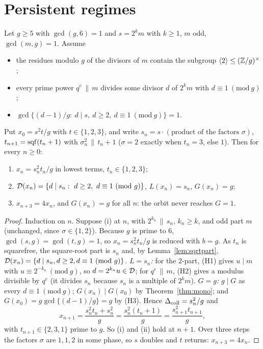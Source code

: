 \section{Persistent regimes}

\begin{theorem}\label{thm:Pg}
Let \(g\ge5\) with \(\gcd(g,6)=1\) and \(s=2^km\) with \(k\ge1\), \(m\) odd, \(\gcd(m,g)=1\). Assume
\begin{itemize}[nosep]
\item[(H1)] the residues modulo \(g\) of the divisors of \(m\) contain the subgroup \(\langle2\rangle\le(\mathbb{Z}/g)^\times\);
\item[(H2)] every prime power \(q^e\,\|\,m\) divides some divisor \(d\) of \(2^km\) with \(d\equiv1\ (\mathrm{mod}\ g)\);
\item[(H3)] \(\gcd\{(d-1)/g:\ d\mid s,\ d\ge2,\ d\equiv1\ (\mathrm{mod}\ g)\}=1\).
\end{itemize}
Put \(x_0=s^2t/g\) with \(t\in\{1,2,3\}\), and write \(s_n=s\cdot(\text{product of the factors }\sigma)\), \(t_{n+1}=\operatorname{sqf}(t_n+1)\) with \(\sigma_n^2\,\|\,t_n+1\) (\(\sigma=2\) exactly when \(t_n=3\), else \(1\)). Then for every \(n\ge0\):
\begin{enumerate}[label=(\roman*),nosep]
\item \(x_n=s_n^2t_n/g\) in lowest terms, \(t_n\in\{1,2,3\}\);
\item \(\Dx(x_n)=\{d\mid s_n:\ d\ge2,\ d\equiv1\ (\mathrm{mod}\ g)\}\), \(L(x_n)=s_n\), \(G(x_n)=g\);
\item \(x_{n+3}=4x_n\), and \(G(x_n)=g\) for all \(n\): the orbit never reaches \(G=1\).
\end{enumerate}
\end{theorem}
\begin{proof}
Induction on \(n\). Suppose (i) at \(n\), with \(2^{k_n}\,\|\,s_n\), \(k_n\ge k\), and odd part \(m\) (unchanged, since \(\sigma\in\{1,2\}\)). Because \(g\) is prime to 6, \(\gcd(s,g)=\gcd(t,g)=1\), so \(x_n=s_n^2t_n/g\) is reduced with \(b=g\). As \(t_n\) is squarefree, the square-root part is \(s_n\) and, by Lemma~\ref{lem:sqrtpart}, \(\Dx(x_n)=\{d\mid s_n,d\ge2,d\equiv1\ (\mathrm{mod}\ g)\}\). \emph{\(L=s_n\):} for the 2-part, (H1) gives \(u\mid m\) with \(u\equiv2^{-k_n}\ (\mathrm{mod}\ g)\), so \(d=2^{k_n}u\in\mathcal{D}\); for \(q^e\,\|\,m\), (H2) gives a modulus divisible by \(q^e\) (it divides \(s_n\) because \(s_n\) is a multiple of \(2^km\)). \emph{\(G=g\):} \(g\mid G\) as every \(d\equiv1\ (\mathrm{mod}\ g)\); \(G(x_n)\mid G(x_0)\) by Theorem~\ref{thm:mono}; and \(G(x_0)=g\gcd\{(d-1)/g\}=g\) by (H3). Hence \(\Delta_{\mathrm{coll}}=s_n^2/g\) and
\[
x_{n+1}=\frac{s_n^2t_n+s_n^2}{g}=\frac{s_n^2(t_n+1)}{g}=\frac{s_{n+1}^2t_{n+1}}{g},
\]
with \(t_{n+1}\in\{2,3,1\}\) prime to \(g\). So (i) and (ii) hold at \(n+1\). Over three steps the factors \(\sigma\) are \(1,1,2\) in some phase, so \(s\) doubles and \(t\) returns: \(x_{n+3}=4x_n\).
\end{proof}

